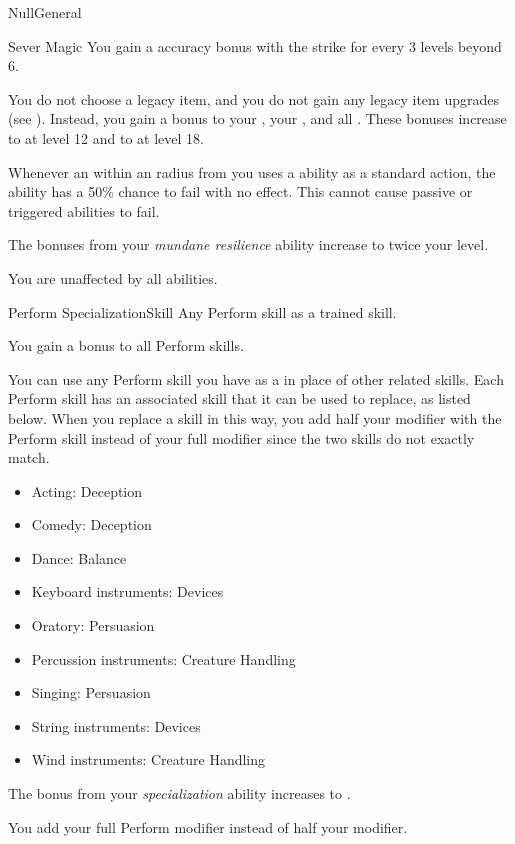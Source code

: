\begin{feat}{Null}{General}
\begin{activeability}{Sever Magic}
            \rankline
            You gain a  accuracy bonus with the strike for every 3 levels beyond 6.
        \end{activeability}

         You do not choose a legacy item, and you do not gain any legacy item upgrades (see ).
        Instead, you gain a  bonus to your , your , and all .
        These bonuses increase to  at level 12 and to  at level 18.

         Whenever an  within an \medarea radius from you uses a \magical ability as a standard action, the ability has a 50\% chance to fail with no effect.
        This cannot cause passive or triggered abilities to fail.

         The bonuses from your \textit{mundane resilience} ability increase to twice your level.

         You are unaffected by all \magical abilities.
    \end{feat}

    \begin{feat}{Perform Specialization}{Skill}
        \featpre Any Perform skill as a trained skill.

         You gain a  bonus to all Perform skills.

         You can use any Perform skill you have as a  in place of other related skills.
        Each Perform skill has an associated skill that it can be used to replace, as listed below.
        When you replace a skill in this way, you add half your modifier with the Perform skill instead of your full modifier since the two skills do not exactly match.
        \begin{itemize}
            \item Acting: Deception
            \item Comedy: Deception
            \item Dance: Balance
            \item Keyboard instruments: Devices
            \item Oratory: Persuasion
            \item Percussion instruments: Creature Handling
            \item Singing: Persuasion
            \item String instruments: Devices
            \item Wind instruments: Creature Handling
        \end{itemize}

         The bonus from your \textit{specialization} ability increases to .

         You add your full Perform modifier instead of half your modifier.
    \end{feat}

